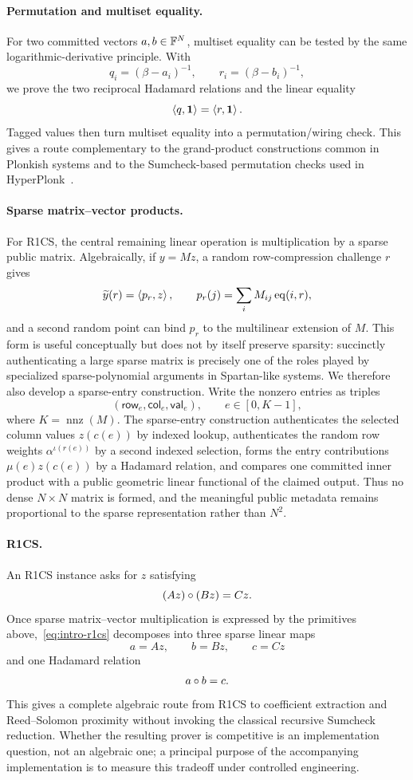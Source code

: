 \paragraph{Permutation and multiset equality.}
For two committed vectors $a,b\in\mathbb{F}^N$, multiset equality can be tested by the same logarithmic-derivative principle.  With
\[
  q_i=(\beta-a_i)^{-1},\qquad r_i=(\beta-b_i)^{-1},
\]
we prove the two reciprocal Hadamard relations and the linear equality
\[
  \left\langle q,\mathbf 1\right\rangle=\left\langle r,\mathbf 1\right\rangle.
\]
Tagged values then turn multiset equality into a permutation/wiring check.  This gives a route complementary to the grand-product constructions common in Plonkish systems and to the Sumcheck-based permutation checks used in HyperPlonk~\cite{HyperPlonk23}.

\paragraph{Sparse matrix--vector products.}
For R1CS, the central remaining linear operation is multiplication by a sparse public matrix.  Algebraically, if $y=Mz$, a random row-compression challenge $r$ gives
\[
  \widetilde y(r)=\left\langle p_r,z\right\rangle,
  \qquad
  p_r(j)=\sum_iM_{ij}\operatorname{eq}(i,r),
\]
and a second random point can bind $p_r$ to the multilinear extension of $M$.  This form is useful conceptually but does not by itself preserve sparsity: succinctly authenticating a large sparse matrix is precisely one of the roles played by specialized sparse-polynomial arguments in Spartan-like systems.  We therefore also develop a sparse-entry construction.  Write the nonzero entries as triples
\[
  (\mathsf{row}_e,\mathsf{col}_e,\mathsf{val}_e),
  \qquad e\in[0,K-1],
\]
where $K=\operatorname{nnz}(M)$.  The sparse-entry construction authenticates the selected column values $z(c(e))$ by indexed lookup, authenticates the random row weights $\alpha^{\iota(r(e))}$ by a second indexed selection, forms the entry contributions $\mu(e)z(c(e))$ by a Hadamard relation, and compares one committed inner product with a public geometric linear functional of the claimed output.  Thus no dense $N\times N$ matrix is formed, and the meaningful public metadata remains proportional to the sparse representation rather than $N^2$.

\paragraph{R1CS.}
An R1CS instance asks for $z$ satisfying
\begin{equation}
  (Az)\circ(Bz)=Cz.
  \label{eq:intro-r1cs}
\end{equation}
Once sparse matrix--vector multiplication is expressed by the primitives above,~\eqref{eq:intro-r1cs} decomposes into three sparse linear maps
\[
  a=Az,\qquad b=Bz,\qquad c=Cz
\]
and one Hadamard relation
\[
  a\circ b=c.
\]
This gives a complete algebraic route from R1CS to coefficient extraction and Reed--Solomon proximity without invoking the classical recursive Sumcheck reduction.  Whether the resulting prover is competitive is an implementation question, not an algebraic one; a principal purpose of the accompanying implementation is to measure this tradeoff under controlled engineering.

